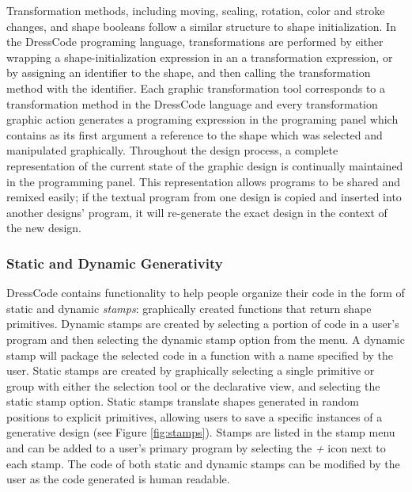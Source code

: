 \documentclass{sigchi}
\begin{document}
Transformation methods, including moving, scaling, rotation, color and stroke changes, and shape booleans follow a similar structure to shape initialization. In the DressCode programing language, transformations are performed by either wrapping a shape-initialization expression in an a transformation expression, or by assigning an identifier to the shape, and then calling the transformation method with the identifier. Each graphic transformation tool corresponds to a transformation method in the DressCode language and every transformation graphic action generates a programing expression in the programing panel which contains as its first argument a reference to the shape which was selected and manipulated graphically. Throughout the design process, a complete representation of the current state of the graphic design is continually maintained in the programming panel. This representation allows programs to be shared and remixed easily; if the textual program from one design is copied and inserted into another designs' program, it will re-generate the exact design in the context of the new  design. 

\subsubsection{Static and Dynamic Generativity}
DressCode contains functionality to help people organize their code in the form of static and dynamic \textit{stamps}: graphically created functions that return shape primitives. Dynamic stamps are created by selecting a portion of code in a user's program and then selecting the dynamic stamp option from the menu. A dynamic stamp will package the selected code in a function with a name specified by the user. Static stamps are created by graphically selecting a single primitive or group with either the selection tool or the declarative view, and selecting the static stamp option. Static stamps translate shapes generated in random positions to explicit primitives, allowing users to save a specific instances of a generative design (see Figure \ref{fig:stamps}).
Stamps are listed in the stamp menu and can be added to a user's primary program by selecting the \textit{+} icon next to each stamp. The code of both static and dynamic stamps can be modified by the user as the code generated is human readable.
\end{document}

